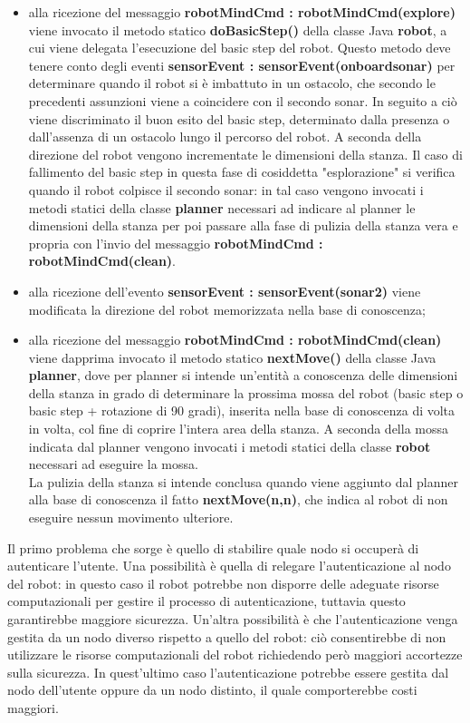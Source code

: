 \documentclass{llncs}
\begin{document}
\begin{itemize}
	\item alla ricezione del messaggio \textbf{robotMindCmd : robotMindCmd(explore)} viene invocato il metodo statico \textbf{doBasicStep()} della classe Java \textbf{robot}, a cui viene delegata l'esecuzione del basic step del robot. Questo metodo deve tenere conto degli eventi \textbf{sensorEvent : sensorEvent(onboardsonar)} per determinare quando il robot si è imbattuto in un ostacolo, che secondo le precedenti assunzioni viene a coincidere con il secondo sonar. In seguito a ciò viene discriminato il buon esito del basic step, determinato dalla presenza o dall'assenza di un ostacolo lungo il percorso del robot. A seconda della direzione del robot vengono incrementate le dimensioni della stanza. Il caso di fallimento del basic step in questa fase di cosiddetta "esplorazione" si verifica quando il robot colpisce il secondo sonar: in tal caso vengono invocati i metodi statici della classe \textbf{planner} necessari ad indicare al planner le dimensioni della stanza per poi passare alla fase di pulizia della stanza vera e propria con l'invio del messaggio \textbf{robotMindCmd : robotMindCmd(clean)}.
	\item alla ricezione dell'evento \textbf{sensorEvent : sensorEvent(sonar2)} viene modificata la direzione del robot memorizzata nella base di conoscenza;
	\item alla ricezione del messaggio \textbf{robotMindCmd : robotMindCmd(clean)} viene dapprima invocato il metodo statico \textbf{nextMove()} della classe Java \textbf{planner}, dove per planner si intende un'entità a conoscenza delle dimensioni della stanza in grado di determinare la prossima mossa del robot (basic step o basic step + rotazione di 90 gradi), inserita nella base di conoscenza di volta in volta, col fine di coprire l'intera area della stanza. A seconda della mossa indicata dal planner vengono invocati i metodi statici della classe \textbf{robot} necessari ad eseguire la mossa. \\ La pulizia della stanza si intende conclusa quando viene aggiunto dal planner alla base di conoscenza il fatto \textbf{nextMove(n,n)}, che indica al robot di non eseguire nessun movimento ulteriore. 
\end{itemize}

Il primo problema che sorge è quello di stabilire quale nodo si occuperà di autenticare l'utente. Una possibilità è quella di relegare l'autenticazione al nodo del robot: in questo caso il robot potrebbe non disporre delle adeguate risorse computazionali per gestire il processo di autenticazione, tuttavia questo garantirebbe maggiore sicurezza. Un'altra possibilità è che l'autenticazione venga gestita da un nodo diverso rispetto a quello del robot: ciò consentirebbe di non utilizzare le risorse computazionali del robot richiedendo però maggiori accortezze sulla sicurezza. In quest'ultimo caso l'autenticazione potrebbe essere gestita dal nodo dell'utente oppure da un nodo distinto, il quale comporterebbe costi maggiori.
\end{document}
